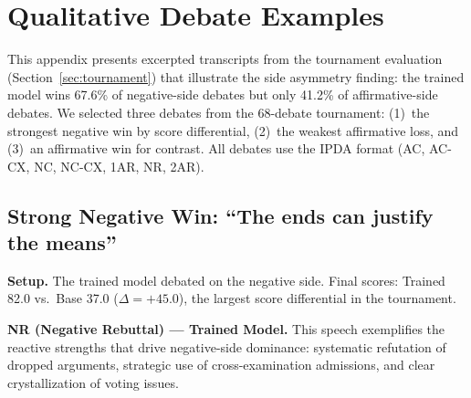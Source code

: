\section{Qualitative Debate Examples}
\label{app:debate_examples}

This appendix presents excerpted transcripts from the tournament evaluation
(Section~\ref{sec:tournament}) that illustrate the side asymmetry finding:
the trained model wins 67.6\% of negative-side debates but only 41.2\% of
affirmative-side debates. We selected three debates from the 68-debate
tournament: (1)~the strongest negative win by score differential,
(2)~the weakest affirmative loss, and (3)~an affirmative win for contrast.
All debates use the IPDA format (AC, AC-CX, NC, NC-CX, 1AR, NR, 2AR).

\subsection{Strong Negative Win: ``The ends can justify the means''}
\label{app:neg_win_example}

\noindent\textbf{Setup.} The trained model debated on the negative side.
Final scores: Trained 82.0 vs.\ Base 37.0 ($\Delta = +45.0$), the largest
score differential in the tournament.

\medskip
\noindent\textbf{NR (Negative Rebuttal) --- Trained Model.}
This speech exemplifies the reactive strengths that drive negative-side
dominance: systematic refutation of dropped arguments, strategic use of
cross-examination admissions, and clear crystallization of voting issues.

